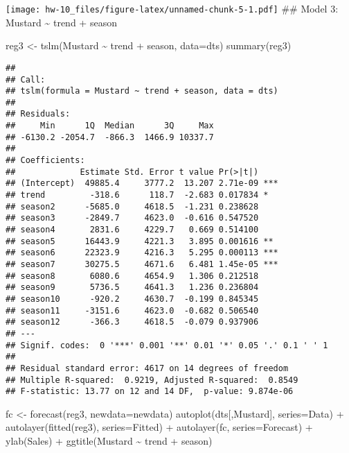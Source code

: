 \documentclass[
]{article}
\newenvironment{Shaded}{\begin{snugshade}}{\end{snugshade}}
\newcommand{\AttributeTok}[1]{\textcolor[rgb]{0.77,0.63,0.00}{#1}}
\newcommand{\FunctionTok}[1]{\textcolor[rgb]{0.00,0.00,0.00}{#1}}
\newcommand{\NormalTok}[1]{#1}
\newcommand{\OtherTok}[1]{\textcolor[rgb]{0.56,0.35,0.01}{#1}}
\newcommand{\SpecialCharTok}[1]{\textcolor[rgb]{0.00,0.00,0.00}{#1}}
\newcommand{\StringTok}[1]{\textcolor[rgb]{0.31,0.60,0.02}{#1}}
\begin{document}
\texttt{[image: hw-10\_files/figure-latex/unnamed-chunk-5-1.pdf]} \#\#
Model 3: Mustard \textasciitilde{} trend + season

\begin{Shaded}
\begin{Highlighting}[]
\NormalTok{reg3 }\OtherTok{\textless{}{-}} \FunctionTok{tslm}\NormalTok{(Mustard }\SpecialCharTok{\textasciitilde{}}\NormalTok{ trend }\SpecialCharTok{+}\NormalTok{ season, }\AttributeTok{data=}\NormalTok{dts)}
\FunctionTok{summary}\NormalTok{(reg3)}
\end{Highlighting}
\end{Shaded}

\begin{verbatim}
## 
## Call:
## tslm(formula = Mustard ~ trend + season, data = dts)
## 
## Residuals:
##     Min      1Q  Median      3Q     Max 
## -6130.2 -2054.7  -866.3  1466.9 10337.7 
## 
## Coefficients:
##             Estimate Std. Error t value Pr(>|t|)    
## (Intercept)  49885.4     3777.2  13.207 2.71e-09 ***
## trend         -318.6      118.7  -2.683 0.017834 *  
## season2      -5685.0     4618.5  -1.231 0.238628    
## season3      -2849.7     4623.0  -0.616 0.547520    
## season4       2831.6     4229.7   0.669 0.514100    
## season5      16443.9     4221.3   3.895 0.001616 ** 
## season6      22323.9     4216.3   5.295 0.000113 ***
## season7      30275.5     4671.6   6.481 1.45e-05 ***
## season8       6080.6     4654.9   1.306 0.212518    
## season9       5736.5     4641.3   1.236 0.236804    
## season10      -920.2     4630.7  -0.199 0.845345    
## season11     -3151.6     4623.0  -0.682 0.506540    
## season12      -366.3     4618.5  -0.079 0.937906    
## ---
## Signif. codes:  0 '***' 0.001 '**' 0.01 '*' 0.05 '.' 0.1 ' ' 1
## 
## Residual standard error: 4617 on 14 degrees of freedom
## Multiple R-squared:  0.9219, Adjusted R-squared:  0.8549 
## F-statistic: 13.77 on 12 and 14 DF,  p-value: 9.874e-06
\end{verbatim}

\begin{Shaded}
\begin{Highlighting}[]
\NormalTok{fc }\OtherTok{\textless{}{-}} \FunctionTok{forecast}\NormalTok{(reg3, }\AttributeTok{newdata=}\NormalTok{newdata)}
\FunctionTok{autoplot}\NormalTok{(dts[,}\StringTok{\textquotesingle{}Mustard\textquotesingle{}}\NormalTok{], }\AttributeTok{series=}\StringTok{\textquotesingle{}Data\textquotesingle{}}\NormalTok{) }\SpecialCharTok{+}
  \FunctionTok{autolayer}\NormalTok{(}\FunctionTok{fitted}\NormalTok{(reg3), }\AttributeTok{series=}\StringTok{\textquotesingle{}Fitted\textquotesingle{}}\NormalTok{) }\SpecialCharTok{+}
  \FunctionTok{autolayer}\NormalTok{(fc, }\AttributeTok{series=}\StringTok{\textquotesingle{}Forecast\textquotesingle{}}\NormalTok{) }\SpecialCharTok{+} 
  \FunctionTok{ylab}\NormalTok{(}\StringTok{\textquotesingle{}Sales\textquotesingle{}}\NormalTok{) }\SpecialCharTok{+}
  \FunctionTok{ggtitle}\NormalTok{(}\StringTok{\textquotesingle{}Mustard \textasciitilde{} trend + season\textquotesingle{}}\NormalTok{)}
\end{Highlighting}
\end{Shaded}
\end{document}
